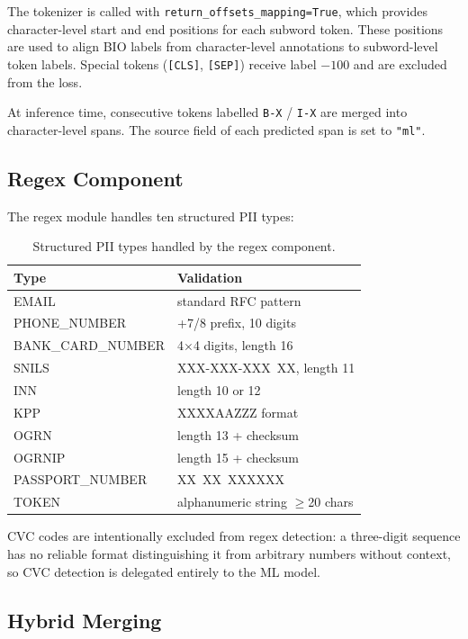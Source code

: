 \documentclass{article}
\begin{document}
The tokenizer is called with \texttt{return\_offsets\_mapping=True}, which provides character-level start and end positions for each subword token. These positions are used to align BIO labels from character-level annotations to subword-level token labels. Special tokens (\texttt{[CLS]}, \texttt{[SEP]}) receive label $-100$ and are excluded from the loss.

At inference time, consecutive tokens labelled \texttt{B-X} / \texttt{I-X} are merged into character-level spans. The source field of each predicted span is set to \texttt{"ml"}.

\subsection{Regex Component}

The regex module handles ten structured PII types:

\begin{table}[tbh!]
\begin{center}
\begin{tabular}[t]{|l|l|}
\hline
\textbf{Type} & \textbf{Validation} \\
\hline
EMAIL & standard RFC pattern \\
PHONE\_NUMBER & +7/8 prefix, 10 digits \\
BANK\_CARD\_NUMBER & 4$\times$4 digits, length 16 \\
SNILS & XXX-XXX-XXX\ XX, length 11 \\
INN & length 10 or 12 \\
KPP & XXXXAAZZZ format \\
OGRN & length 13 + checksum \\
OGRNIP & length 15 + checksum \\
PASSPORT\_NUMBER & XX\ XX\ XXXXXX \\
TOKEN & alphanumeric string $\geq$20 chars \\
\hline
\end{tabular}
\caption{Structured PII types handled by the regex component.}
\label{tab:regex}
\end{center}
\end{table}

CVC codes are intentionally excluded from regex detection: a three-digit sequence has no reliable format distinguishing it from arbitrary numbers without context, so CVC detection is delegated entirely to the ML model.

\subsection{Hybrid Merging}
\end{document}
